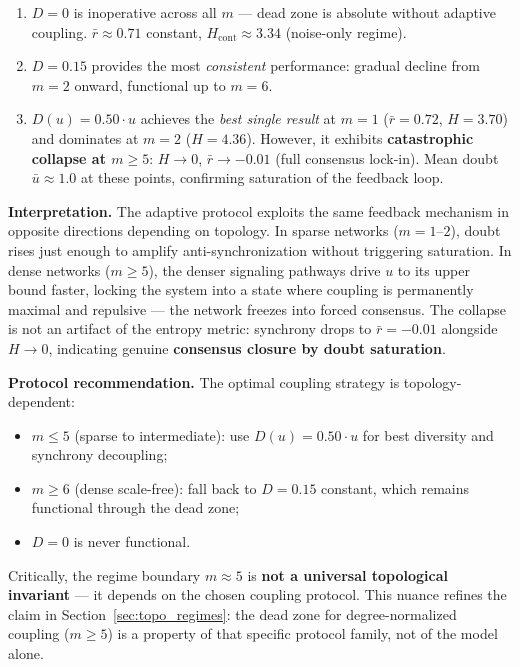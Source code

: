 ﻿\documentclass[11pt]{article}
\begin{document}
\begin{enumerate}
\item $D = 0$ is inoperative across all $m$ --- dead zone is absolute without adaptive coupling. $\bar{r} \approx 0.71$ constant, $H_{\text{cont}} \approx 3.34$ (noise-only regime).
\item $D = 0.15$ provides the most \emph{consistent} performance: gradual decline from $m = 2$ onward, functional up to $m = 6$.
\item $D(u) = 0.50 \cdot u$ achieves the \emph{best single result} at $m = 1$ ($\bar{r} = 0.72$, $H = 3.70$) and dominates at $m = 2$ ($H = 4.36$). However, it exhibits \textbf{catastrophic collapse at $m \geq 5$}: $H \to 0$, $\bar{r} \to -0.01$ (full consensus lock-in). Mean doubt $\bar{u} \approx 1.0$ at these points, confirming saturation of the feedback loop.
\end{enumerate}

\textbf{Interpretation.} The adaptive protocol exploits the same feedback mechanism in opposite directions depending on topology. In sparse networks ($m = 1$--$2$), doubt rises just enough to amplify anti-synchronization without triggering saturation. In dense networks ($m \geq 5$), the denser signaling pathways drive $u$ to its upper bound faster, locking the system into a state where coupling is permanently maximal and repulsive --- the network freezes into forced consensus. The collapse is not an artifact of the entropy metric: synchrony drops to $\bar{r} = -0.01$ alongside $H \to 0$, indicating genuine \textbf{consensus closure by doubt saturation}.

\textbf{Protocol recommendation.} The optimal coupling strategy is topology-dependent:
\begin{itemize}
\item $m \leq 5$ (sparse to intermediate): use $D(u) = 0.50 \cdot u$ for best diversity and synchrony decoupling;
\item $m \geq 6$ (dense scale-free): fall back to $D = 0.15$ constant, which remains functional through the dead zone;
\item $D = 0$ is never functional.
\end{itemize}

Critically, the regime boundary $m \approx 5$ is \textbf{not a universal topological invariant} --- it depends on the chosen coupling protocol. This nuance refines the claim in Section~\ref{sec:topo_regimes}: the dead zone for degree-normalized coupling ($m \geq 5$) is a property of that specific protocol family, not of the model alone.
\end{document}
